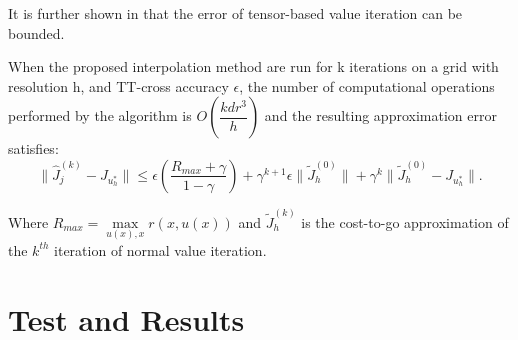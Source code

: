It is further shown in \cite{Gorod} that the error of tensor-based value iteration can be bounded.
\begin{theorem}
When the proposed interpolation method are run for k iterations on a grid with resolution h, and TT-cross accuracy $\epsilon$, the number of computational operations performed by the algorithm is $O(\dfrac{kdr^3}{h})$ and the resulting approximation error satisfies:
\begin{equation*}
\| \hat{J}_j^{(k)}-J_{u_h^*}\| \leq \epsilon(\dfrac{R_{max}+\gamma}{1-\gamma})+\gamma^{k+1}\epsilon \|\tilde{J}_h^{(0)}\|+\gamma^k \|\tilde{J}_h^{(0)}-J_{u_h^*}\|.
\end{equation*}    
\end{theorem}
Where $R_{max} = \underset{u(x), x }{\operatorname{max }} r(x,u(x))$ and $\tilde{J}_h^{(k)}$ is the cost-to-go approximation of the $k^{th}$ iteration of normal value iteration.


\section{Test and Results}

